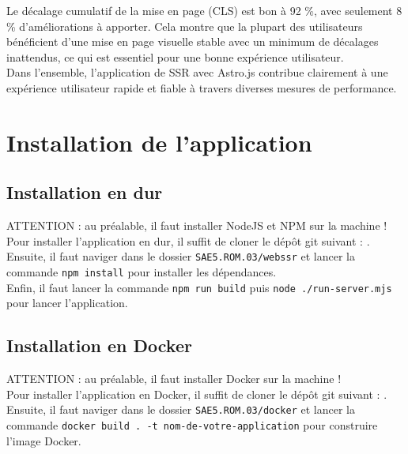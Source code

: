 \documentclass[12pt, a4paper, oneside]{thesis}
\begin{document}
Le décalage cumulatif de la mise en page (CLS) est bon à 92 \%, avec seulement 8 \% d'améliorations à apporter. Cela montre que la plupart des utilisateurs bénéficient d'une mise en page visuelle stable avec un minimum de décalages inattendus, ce qui est essentiel pour une bonne expérience utilisateur.\\

Dans l'ensemble, l'application de SSR avec Astro.js contribue clairement à une expérience utilisateur rapide et fiable à travers diverses mesures de performance.


\newpage
\section{Installation de l'application}

\subsection{Installation en dur}

ATTENTION : au préalable, il faut installer NodeJS et NPM sur la machine !\\

Pour installer l'application en dur, il suffit de cloner le dépôt git suivant : \url{}{}.\\

Ensuite, il faut naviger dans le dossier \verb|SAE5.ROM.03/webssr| et lancer la commande \verb|npm install| pour installer les dépendances.\\
Enfin, il faut lancer la commande \verb|npm run build| puis \verb|node ./run-server.mjs| pour lancer l'application.\\

\subsection{Installation en Docker}

ATTENTION : au préalable, il faut installer Docker sur la machine !\\

Pour installer l'application en Docker, il suffit de cloner le dépôt git suivant : \url{}{}.\\

Ensuite, il faut naviger dans le dossier \verb|SAE5.ROM.03/docker| et lancer la commande \verb|docker build . -t nom-de-votre-application| pour construire l'image Docker.\\
\end{document}
